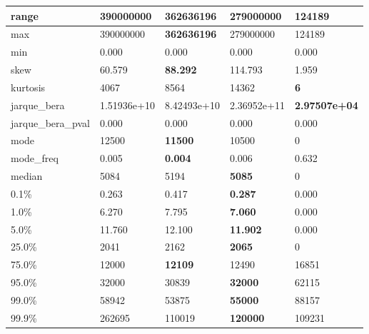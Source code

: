 \begin{table}[H]
\begin{tabular}{|l|m{10em}|m{10em}|m{10em}|m{10em}|}
\hline range & 390000000 & \bfseries 362636196 & 279000000 & \cellcolor[rgb]{0.9, 0.54, 0.52} 124189 \\
\hline max & 390000000 & \bfseries 362636196 & 279000000 & \cellcolor[rgb]{0.9, 0.54, 0.52} 124189 \\
\hline min & 0.000 & 0.000 & 0.000 & 0.000 \\
\hline skew & 60.579 & \bfseries 88.292 & 114.793 & \cellcolor[rgb]{0.9, 0.54, 0.52} 1.959 \\
\hline kurtosis & 4067 & 8564 & \cellcolor[rgb]{0.9, 0.54, 0.52} 14362 & \bfseries 6 \\
\hline jarque\_bera & 1.51936e+10 & 8.42493e+10 & \cellcolor[rgb]{0.9, 0.54, 0.52} 2.36952e+11 & \bfseries 2.97507e+04 \\
\hline jarque\_bera\_pval & 0.000 & 0.000 & 0.000 & 0.000 \\
\hline mode & 12500 & \bfseries 11500 & 10500 & \cellcolor[rgb]{0.9, 0.54, 0.52} 0 \\
\hline mode\_freq & 0.005 & \bfseries 0.004 & 0.006 & \cellcolor[rgb]{0.9, 0.54, 0.52} 0.632 \\
\hline median & 5084 & 5194 & \bfseries 5085 & \cellcolor[rgb]{0.9, 0.54, 0.52} 0 \\
\hline 0.1\% & 0.263 & 0.417 & \bfseries 0.287 & \cellcolor[rgb]{0.9, 0.54, 0.52} 0.000 \\
\hline 1.0\% & 6.270 & 7.795 & \bfseries 7.060 & \cellcolor[rgb]{0.9, 0.54, 0.52} 0.000 \\
\hline 5.0\% & 11.760 & 12.100 & \bfseries 11.902 & \cellcolor[rgb]{0.9, 0.54, 0.52} 0.000 \\
\hline 25.0\% & 2041 & 2162 & \bfseries 2065 & \cellcolor[rgb]{0.9, 0.54, 0.52} 0 \\
\hline 75.0\% & 12000 & \bfseries 12109 & 12490 & \cellcolor[rgb]{0.9, 0.54, 0.52} 16851 \\
\hline 95.0\% & 32000 & 30839 & \bfseries 32000 & \cellcolor[rgb]{0.9, 0.54, 0.52} 62115 \\
\hline 99.0\% & 58942 & 53875 & \bfseries 55000 & \cellcolor[rgb]{0.9, 0.54, 0.52} 88157 \\
\hline 99.9\% & 262695 & 110019 & \bfseries 120000 & \cellcolor[rgb]{0.9, 0.54, 0.52} 109231 \\
\hline
\end{tabular}
\end{table}
